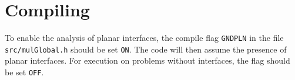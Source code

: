 \section{Compiling}
\label{comfas}

To enable the analysis of planar interfaces, the compile flag {\tt GNDPLN}
in the file {\tt src/mulGlobal.h} should be set {\tt ON}.  The code will
then assume the presence of planar interfaces.  For execution on problems
without interfaces, the flag should be set {\tt OFF}. 


